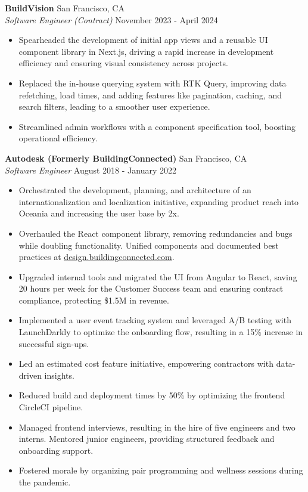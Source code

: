 \documentclass[a4paper]{article}
\begin{document}
\textbf{BuildVision} \hfill San Francisco, CA\\
\textit{Software Engineer (Contract)} \hfill November 2023 - April 2024\\
\vspace{-1mm}
\begin{itemize} \itemsep .5pt
    \item Spearheaded the development of initial app views and a reusable UI component library in Next.js, driving a rapid increase in development efficiency and ensuring visual consistency across projects.
    \item Replaced the in-house querying system with RTK Query, improving data refetching, load times, and adding features like pagination, caching, and search filters, leading to a smoother user experience.
    \item Streamlined admin workflows with a component specification tool, boosting operational efficiency.
\end{itemize}

\textbf{Autodesk (Formerly BuildingConnected)} \hfill San Francisco, CA\\
\textit{Software Engineer} \hfill August 2018 - January 2022\\
\vspace{-1mm}
\begin{itemize} \itemsep .5pt
    \item Orchestrated the development, planning, and architecture of an internationalization and localization initiative, expanding product reach into Oceania and increasing the user base by 2x.
    \item Overhauled the React component library, removing redundancies and bugs while doubling functionality. Unified components and documented best practices at \href{https://design.buildingconnected.com/}{\underline{design.buildingconnected.com}}.
    \item Upgraded internal tools and migrated the UI from Angular to React, saving 20 hours per week for the Customer Success team and ensuring contract compliance, protecting \$1.5M in revenue.
    \item Implemented a user event tracking system and leveraged A/B testing with LaunchDarkly to optimize the onboarding flow, resulting in a 15\% increase in successful sign-ups.
    \item Led an estimated cost feature initiative, empowering contractors with data-driven insights.
    \item Reduced build and deployment times by 50\% by optimizing the frontend CircleCI pipeline.
    \item Managed frontend interviews, resulting in the hire of five engineers and two interns. Mentored junior engineers, providing structured feedback and onboarding support.
    \item Fostered morale by organizing pair programming and wellness sessions during the pandemic.
\end{itemize}
\end{document}
